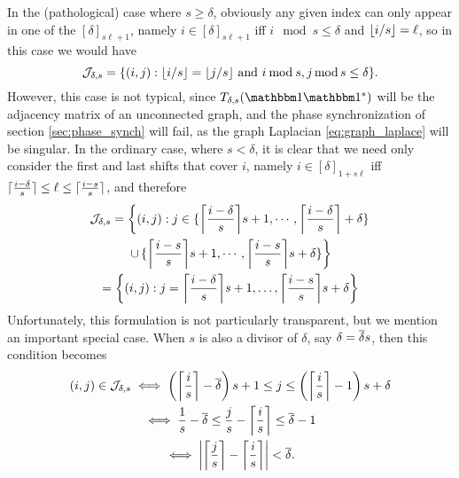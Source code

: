 In the (pathological) case where $s \ge \delta$, obviously any given index can only appear in one of the $[\delta]_{s \ell + 1}$, namely $i \in [\delta]_{s \ell + 1}$ iff $i \mod s \le \delta$ and $\floor{i / s} = \ell$, so in this case we would have \[\mathcal{J}_{\delta, s} = \{(i, j) : \floor{i / s} = \floor{j / s} \ \text{and} \ i \mathbin{\mathrm{mod}} s, j \mod s \le \delta\}.\]  However, this case is not typical, since $T_{\delta, s}(\one \one^*)$ will be the adjacency matrix of an unconnected graph, and the phase synchronization of section \ref{sec:phase_synch} will fail, as the graph Laplacian \eqref{eq:graph_laplace} will be singular.  In the ordinary case, where $s < \delta$, it is clear that we need only consider the first and last shifts that cover $i$, namely $i \in [\delta]_{1 + s \ell}$ iff $\ceil{\frac{i - \delta}{s}} \le \ell \le \ceil{\frac{i - s}{s}}$, and therefore
\begin{gather*}
  \mathcal{J}_{\delta, s} = \left\{(i, j) : j \in \{\ceil*{\frac{i - \delta}{s}}s + 1, \cdots, \ceil*{\frac{i - \delta}{s}} + \delta\}\right. \\
  \left. \cup\, \{\ceil*{\frac{i - s}{s}}s + 1, \cdots, \ceil*{\frac{i - s}{s}}s + \delta\} \right\} \\
  = \left\{(i, j) : j = \ceil*{\frac{i - \delta}{s}}s + 1, \ldots, \ceil*{\frac{i - s}{s}}s + \delta \right\}
\end{gather*}
Unfortunately, this formulation is not particularly transparent, but we mention an important special case.  When $s$ is also a divisor of $\delta$, say $\delta = \deltabar s$, then this condition becomes
\begin{gather*}
  (i, j) \in \mathcal{J}_{\delta, s} \iff \left(\ceil*{\frac{i}{s}} - \deltabar\right) s + 1 \le j \le \left(\ceil*{\frac{i}{s}} - 1\right) s + \delta \\
  \iff \frac{1}{s} - \deltabar \le  \frac{j}{s} - \ceil*{\frac{i}{s}} \le \deltabar - 1 \\
  \iff \left| \ceil*{\frac{j}{s}} - \ceil*{\frac{i}{s}} \right| < \deltabar.
\end{gather*}

